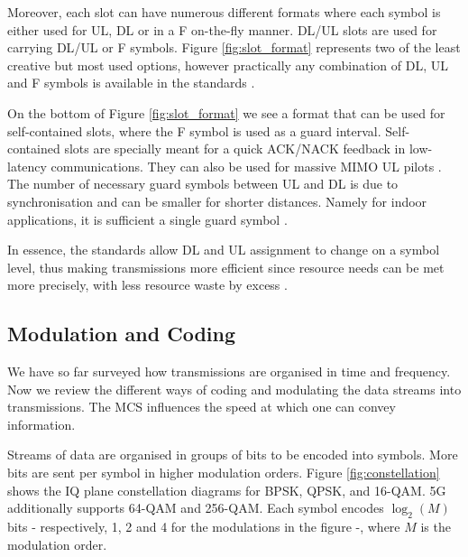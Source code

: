 Moreover, each slot can have numerous different formats where each symbol is either used for UL, DL or in a \ac{F} on-the-fly manner. \ac{DL}/\ac{UL} slots are used for carrying \ac{DL}/\ac{UL} or \ac{F} symbols. Figure \ref{fig:slot_format} represents two of the least creative but most used options, however practically any combination of DL, UL and F symbols is available in the standards \cite{3gpp_slot_periodicity}. 


On the bottom of Figure \ref{fig:slot_format} we see a format that can be used for self-contained slots, where the F symbol is used as a guard interval. Self-contained slots are specially meant for a quick ACK/NACK feedback in low-latency communications. They can also be used for massive MIMO UL pilots \cite{qualcomm_innovative_five}. The number of necessary guard symbols between UL and DL is due to synchronisation and can be smaller for shorter distances. Namely for indoor applications, it is sufficient a single guard symbol \cite{rel15_self_contained_slot_qualcomm}.

In essence, the standards allow DL and UL assignment to change on a symbol level, thus making transmissions more efficient since resource needs can be met more precisely, with less resource waste by excess \cite{air_interface_system_principles}.


\subsection*{Modulation and Coding}

We have so far surveyed how transmissions are organised in time and frequency. Now we review the different ways of coding and modulating the data streams into transmissions. The \ac{MCS} influences the speed at which one can convey information.

Streams of data are organised in groups of bits to be encoded into symbols. More bits are sent per symbol in higher modulation orders. Figure \ref{fig:constellation} shows the \ac{IQ} plane constellation diagrams for \ac{BPSK}, \ac{QPSK}, and 16-\ac{QAM}. 5G additionally supports 64-QAM and 256-QAM. Each symbol encodes $\log_2(M)$ bits - respectively, 1, 2 and 4 for the modulations in the figure -, where $M$ is the modulation order.


